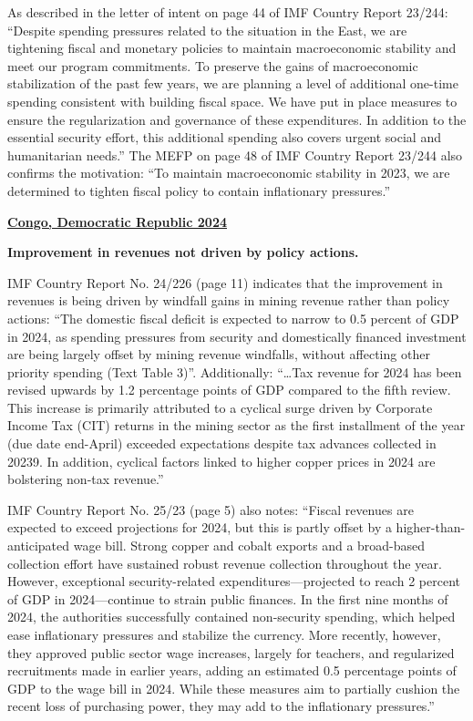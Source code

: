 As described in the letter of intent on page 44 of IMF Country Report 23/244: “Despite spending pressures related to the situation in the East, we are tightening fiscal and monetary policies to maintain macroeconomic stability and meet our program commitments. To preserve the gains of macroeconomic stabilization of the past few years, we are planning a level of additional one-time spending consistent with building fiscal space. We have put in place measures to ensure the regularization and governance of these expenditures. In addition to the essential security effort, this additional spending also covers urgent social and humanitarian needs.”
The MEFP on page 48 of IMF Country Report 23/244 also confirms the motivation: “To maintain macroeconomic stability in 2023, we are determined to tighten fiscal policy to contain inflationary pressures.”

\textbf{\underline{Congo, Democratic Republic 2024}}

\textbf{Improvement in revenues not driven by policy actions.} 

IMF Country Report No. 24/226 (page 11) indicates that the improvement in revenues is being driven by windfall gains in mining revenue rather than policy actions: “The domestic fiscal deficit is expected to narrow to 0.5 percent of GDP in 2024, as spending pressures from security and domestically financed investment are being largely offset by mining revenue windfalls, without affecting other priority spending (Text Table 3)”. Additionally: “…Tax revenue for 2024 has been revised upwards by 1.2 percentage points of GDP compared to the fifth review. This increase is primarily attributed to a cyclical surge driven by Corporate Income Tax (CIT) returns in the mining sector as the first installment of the year (due date end-April) exceeded expectations despite tax advances collected in 20239. In addition, cyclical factors linked to higher copper prices in 2024 are bolstering non-tax revenue.”

IMF Country Report No. 25/23 (page 5) also notes: “Fiscal revenues are expected to exceed projections for 2024, but this is partly offset by a higher-than-anticipated wage bill. Strong copper and cobalt exports and a broad-based collection effort have sustained robust revenue collection throughout the year. However, exceptional security-related expenditures—projected to reach 2 percent of GDP in 2024—continue to strain public finances. In the first nine months of 2024, the authorities successfully contained non-security spending, which helped ease inflationary pressures and stabilize the currency. More recently, however, they approved public sector wage increases, largely for teachers, and regularized recruitments made in earlier years, adding an estimated 0.5 percentage points of GDP to the wage bill in 2024. While these measures aim to partially cushion the recent loss of purchasing power, they may add to the inflationary pressures.”

